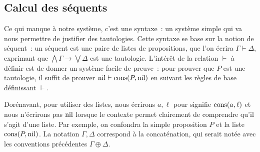 \subsection{Calcul des séquents}

Ce qui manque à notre système, c'est une syntaxe~: un système simple qui va nous
permettre de justifier des tautologies. Cette syntaxe se base sur la notion de
séquent~: un séquent est une paire de listes de propositions, que l'on écrira
$\Gamma\vdash \Delta$, exprimant que $\bigwedge \Gamma \to \bigvee \Delta$ est
une tautologie. L'intérêt de la relation $\vdash$ à définir est de donner un
système facile de preuve~: pour prouver que $P$ est une tautologie, il suffit
de prouver $\operatorname{nil}\vdash \operatorname{cons}(P,\operatorname{nil})$ en suivant les règles de base définissant
$\vdash$.

\begin{notation}
  Dorénavant, pour utiliser des listes, nous écrirons $a, \ell$ pour signifie
  $\operatorname{cons}(a,\ell)$ et nous n'écrirons pas $\operatorname{nil}$ lorsque le contexte permet
  clairement de comprendre qu'il s'agit d'une liste. Par exemple, on confondra
  la simple proposition $P$ et la liste $\operatorname{cons}(P,\operatorname{nil})$. La notation
  $\Gamma,\Delta$ correspond à la concaténation, qui serait notée avec les
  conventions précédentes $\Gamma\oplus\Delta$.
\end{notation}

